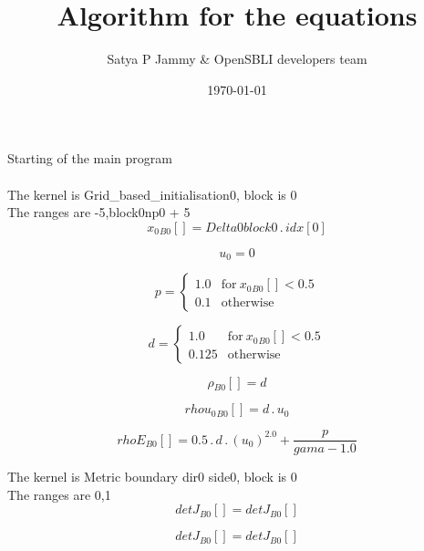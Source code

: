 \documentclass{article}
\title{Algorithm for the equations}
\author{Satya P Jammy \& OpenSBLI developers team}
\date{\today}
\begin{document}
\maketitle
\noindent Starting of the main program\\
\\\noindent The kernel is Grid_based_initialisation0, block is 0\\\noindent The ranges are -5,block0np0 + 5\\\begin{dmath}{x_{0}{_{B0}}}[{}] = Delta0block0 \,.\, {idx}[{0}]\end{dmath}

\begin{dmath}u_{0} = 0\end{dmath}

\begin{dmath}p = \begin{cases} 1.0 & \text{for}\: {x_{0}{_{B0}}}[{}] < 0.5 \\0.1 & \text{otherwise} \end{cases}\end{dmath}

\begin{dmath}d = \begin{cases} 1.0 & \text{for}\: {x_{0}{_{B0}}}[{}] < 0.5 \\0.125 & \text{otherwise} \end{cases}\end{dmath}

\begin{dmath}{\rho{_{B0}}}[{}] = d\end{dmath}

\begin{dmath}{rhou_{0}{_{B0}}}[{}] = d \,.\, u_{0}\end{dmath}

\begin{dmath}{rhoE{_{B0}}}[{}] = 0.5 \,.\, d \,.\, \left(u_{0} \right)^{2.0} + \frac{p}{gama - 1.0}\end{dmath}

\noindent The kernel is Metric boundary dir0 side0, block is 0\\\noindent The ranges are 0,1\\\begin{dmath}{detJ{_{B0}}}[{}] = {detJ{_{B0}}}[{}]\end{dmath}

\begin{dmath}{detJ{_{B0}}}[{}] = {detJ{_{B0}}}[{}]\end{dmath}
\end{document}
